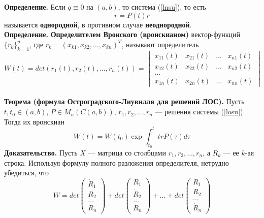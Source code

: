 \textbf{Определение.} Если $q \equiv 0$ на $(a,b)$, то система (\ref{lnsu}), то есть
\begin{equation}
    \dot{r} = P(t)r \label{losu}
\end{equation}
называется \textbf{однородной}, в противном случае \textbf{неоднородной}.\\

\noindent \textbf{Определение.} \textbf{Определителем Вронского (вронскианом)} вектор-функций $\{r_k\}_{k=1}^n$, где $r_k=(x_{k1}, x_{k2}, \ldots, x_{kn})^T$, называют определитель
\begin{equation*}
    W(t) = det(r_1(t),r_2(t),\ldots, r_n(t)) = \begin{vmatrix}
    x_{11}(t) & x_{21}(t) & \ldots & x_{n1}(t)\\
    x_{12}(t) & x_{22}(t) & \ldots & x_{n2}(t)\\
    \ldots\\
    x_{1n}(t) & x_{2n}(t) & \ldots & x_{nn}(t)
    \end{vmatrix}
\end{equation*}
\\
\noindent \textbf{Теорема (формула Остроградского-Лиувилля для решений ЛОС).} Пусть $t, t_0 \in (a,b)$, $P \in M_n(C(a,b))$, $r_1, r_2, \ldots, r_n$ --- решения системы (\ref{losu}). Тогда их вронскиан
\begin{equation*}
    W(t) = W(t_0)\exp \int_{t_0}^t trP(\tau)d\tau
\end{equation*}
\textbf{Доказательство.} Пусть $X$ --- матрица со столбцами $r_1, r_2, \ldots, r_n$, а $R_k$ --- ее $k$-ая строка. Используя формулу полного разложения определителя, нетрудно убедиться, что
\begin{equation*}
    \dot{W} = det\begin{pmatrix}
    \dot{R}_1\\
    R_2\\
    \ldots\\
    R_n
    \end{pmatrix} + det\begin{pmatrix}
    R_1\\
    \dot{R}_2\\
    \ldots\\
    R_n
    \end{pmatrix} + \ldots + det\begin{pmatrix}
    R_1\\
    R_2\\
    \ldots\\
    \dot{R}_n
    \end{pmatrix}
\end{equation*}

